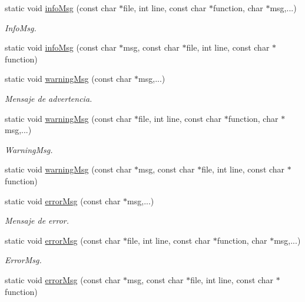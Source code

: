 \begin{DoxyCompactItemize}
static void \hyperlink{class_i3_d_1_1_log_msg_a138623d5ab79424257bf1e0eae8c9a63}{info\+Msg} (const char $\ast$file, int line, const char $\ast$function, char $\ast$msg,...)
\begin{DoxyCompactList}\small\item\em Info\+Msg. \end{DoxyCompactList}\item 
static void \hyperlink{class_i3_d_1_1_log_msg_ae09d58de7331a1d770da8baf34bb24f2}{info\+Msg} (const char $\ast$msg, const char $\ast$file, int line, const char $\ast$function)
\item 
static void \hyperlink{class_i3_d_1_1_log_msg_a6735f004eeaca67e6296367e7dbf9790}{warning\+Msg} (const char $\ast$msg,...)
\begin{DoxyCompactList}\small\item\em Mensaje de advertencia. \end{DoxyCompactList}\item 
static void \hyperlink{class_i3_d_1_1_log_msg_a1c9d60f0b82ac69cf5357d5108cdf903}{warning\+Msg} (const char $\ast$file, int line, const char $\ast$function, char $\ast$msg,...)
\begin{DoxyCompactList}\small\item\em Warning\+Msg. \end{DoxyCompactList}\item 
static void \hyperlink{class_i3_d_1_1_log_msg_acd07dbd3f6748a5d59f6f24fef6171ac}{warning\+Msg} (const char $\ast$msg, const char $\ast$file, int line, const char $\ast$function)
\item 
static void \hyperlink{class_i3_d_1_1_log_msg_a734144928c13e1d2df4d2c523b28f14d}{error\+Msg} (const char $\ast$msg,...)
\begin{DoxyCompactList}\small\item\em Mensaje de error. \end{DoxyCompactList}\item 
static void \hyperlink{class_i3_d_1_1_log_msg_a9a729ff245a2d94d39275c56ca022fdc}{error\+Msg} (const char $\ast$file, int line, const char $\ast$function, char $\ast$msg,...)
\begin{DoxyCompactList}\small\item\em Error\+Msg. \end{DoxyCompactList}\item 
static void \hyperlink{class_i3_d_1_1_log_msg_aab45889313e2a3253c487223e2838409}{error\+Msg} (const char $\ast$msg, const char $\ast$file, int line, const char $\ast$function)
\end{DoxyCompactItemize}
